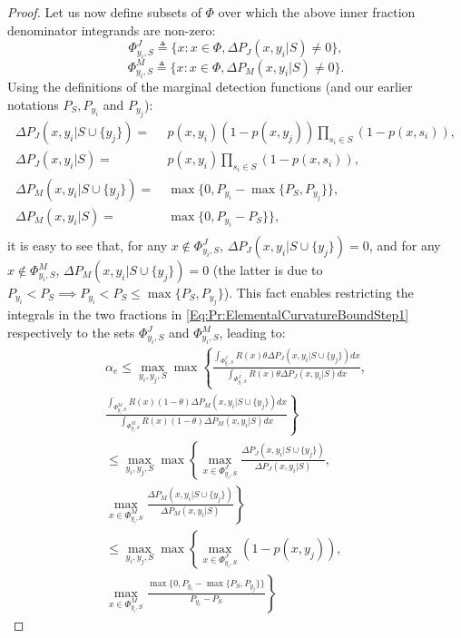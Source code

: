\documentclass[letterpaper, 10 pt, conference]{ieeeconf}
\begin{document}
\begin{proof}
Let us now define subsets of $\Phi$ over which the above inner fraction denominator integrands are non-zero: 
$$\Phi_{y_i,S}^J \triangleq \{x:x\in\Phi,\Delta P_J(x, y_i \vert S)\neq 0\},$$  
$$\Phi_{y_i,S}^M \triangleq \{x:x\in\Phi,\Delta P_M(x, y_i \vert S)\neq 0\}.$$ Using the definitions of the marginal detection functions (and our earlier notations $P_S, P_{y_i}$ and $P_{y_j}$):
\begin{equation}
\begin{aligned}
\Delta P_J(x,y_i\vert S\cup \{y_j\}) =&\  
p(x,y_i)(1-p(x,y_j))\prod_{s_i\in S}(1-p(x,s_i)),\\
\Delta P_J(x,y_i\vert S) =&\  
p(x,y_i)\prod_{s_i\in S}(1-p(x,s_i)),\\
\Delta P_M(x,y_i\vert S\cup \{y_j\}) =&\ \max\{0,P_{y_i}-\max\{P_S,P_{y_j}\}\},\\
\Delta P_M(x,y_i\vert S) =&\ \max\{0,P_{y_i}-P_S\}\},\\
\end{aligned}
\end{equation}
it is easy to see that, for any $x\not\in\Phi_{y_i,S}^J$, $\Delta P_J(x,y_i\vert S\cup \{y_j\}) = 0$, and for any $x\not\in\Phi_{y_i,S}^M$, $\Delta P_M(x,y_i\vert S\cup \{y_j\}) = 0$ (the latter is due to $P_{y_i}<P_S \implies P_{y_i} < P_S \leq \max\{P_S,P_{y_j}\}$). This fact enables restricting the integrals in the two fractions in \eqref{Eq:Pr:ElementalCurvatureBoundStep1} respectively to the sets $\Phi_{y_i,S}^J$ and $\Phi_{y_i,S}^M$, leading to:  
\begin{align}
\alpha_e \leq \max_{y_i,y_j,S}\max \left\{ \frac{\int_{\Phi_{y_i,S}^J} R(x)\theta \Delta P_J(x,y_i\vert S\cup \{y_j\})dx}
{\int_{\Phi_{y_i,S}^J} R(x)\theta \Delta P_J(x,y_i\vert S)dx},\nonumber \right.\\\left. 
\frac{\int_{\Phi_{y_i,S}^M} R(x)(1-\theta) \Delta P_M(x,y_i\vert S\cup \{y_j\})dx}
{\int_{\Phi_{y_i,S}^M} R(x)(1-\theta) \Delta P_M(x,y_i\vert S)dx} \right\}\nonumber\\
\leq 
\max_{y_i,y_j,S}\max \left\{\max_{x\in \Phi_{y_i,S}^J} \frac{\Delta P_J(x,y_i\vert S\cup \{y_j\})}
{\Delta P_J(x,y_i\vert S)},\nonumber \right.\nonumber\\
\left. 
\max_{x\in \Phi_{y_i,S}^M} \frac{\Delta P_M(x,y_i\vert S\cup \{y_j\})}
{\Delta P_M(x,y_i\vert S)} \right\}\nonumber\\
\leq 
\max_{y_i,y_j,S}\max \left\{\max_{x\in \Phi_{y_i,S}^J} (1-p(x,y_j)),\nonumber \right.\\
\label{Eq:Pr:ElementalCurvatureBoundStep2}
\left. 
\max_{x\in \Phi_{y_i,S}^M}\frac{\max\{0,P_{y_i}-\max\{P_S,P_{y_j}\}\}}
{P_{y_i}-P_S} \right\}
\end{align}


\end{proof}
\end{document}
